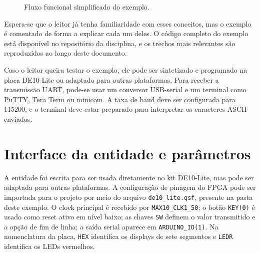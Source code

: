 \documentclass[12pt,a4paper]{book}
\begin{document}
\begin{figure}[h]
\centering
{}
\caption{Fluxo funcional simplificado do exemplo.}
\label{fig:fluxo-funcional}
\end{figure}

Espera-se que o leitor já tenha familiaridade com esses conceitos, mas o exemplo é comentado de forma a explicar cada um deles. O código completo do exemplo está disponível no repositório da disciplina, e os trechos mais relevantes são reproduzidos ao longo deste documento.

Caso o leitor queira testar o exemplo, ele pode ser sintetizado e programado na placa DE10-Lite ou adaptado para outras plataformas. Para receber a transmissão UART, pode-se usar um conversor USB-serial e um terminal como PuTTY, Tera Term ou minicom. A taxa de baud deve ser configurada para 115200, e o terminal deve estar preparado para interpretar os caracteres ASCII enviados.

\section{Interface da entidade e parâmetros}

A entidade foi escrita para ser usada diretamente no kit DE10-Lite, mas pode ser adaptada para outras plataformas. A configuração de pinagem do FPGA pode ser importada para o projeto por meio do arquivo \texttt{de10\_lite.qsf}, presente na pasta deste exemplo. O clock principal é recebido por \texttt{MAX10\_CLK1\_50}; o botão \texttt{KEY(0)} é usado como reset ativo em nível baixo; as chaves \texttt{SW} definem o valor transmitido e a opção de fim de linha; a saída serial aparece em \texttt{ARDUINO\_IO(1)}. Na nomenclatura da placa, \texttt{HEX} identifica os displays de sete segmentos e \texttt{LEDR} identifica os LEDs vermelhos.
\end{document}
